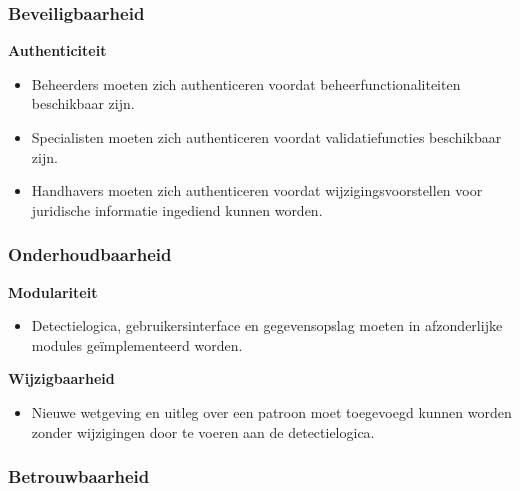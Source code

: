 \subsubsection{Beveiligbaarheid}
\vspace{1em}

\hspace*{1.5em}\textbf{Authenticiteit}

\begin{itemize}
    \item Beheerders moeten zich authenticeren voordat beheerfunctionaliteiten beschikbaar zijn.
    \item Specialisten moeten zich authenticeren voordat validatiefuncties beschikbaar zijn.
    \item Handhavers moeten zich authenticeren voordat wijzigingsvoorstellen voor juridische informatie ingediend kunnen worden.
\end{itemize}

\vspace{1em}

\subsubsection{Onderhoudbaarheid}
\vspace{1em}

\hspace*{1.5em}\textbf{Modulariteit}

\begin{itemize}
    \item Detectielogica, gebruikersinterface en gegevensopslag moeten in afzonderlijke modules geïmplementeerd worden.
\end{itemize}

\vspace{0.5em}

\hspace*{1.5em}\textbf{Wijzigbaarheid}

\begin{itemize}
    \item Nieuwe wetgeving en uitleg over een patroon moet toegevoegd kunnen worden zonder wijzigingen door te voeren aan de detectielogica.
\end{itemize}

\vspace{1em}

\subsubsection{Betrouwbaarheid}
\vspace{1em}


